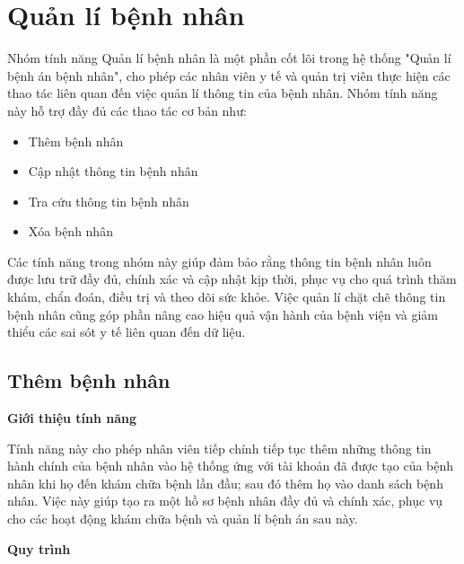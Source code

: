 \section{Quản lí bệnh nhân}

Nhóm tính năng Quản lí bệnh nhân là một phần cốt lõi trong hệ thống "Quản lí bệnh án bệnh nhân", cho phép các nhân viên y tế và quản trị viên thực hiện các thao tác liên quan đến việc quản lí thông tin của bệnh nhân. Nhóm tính năng này hỗ trợ đầy đủ các thao tác cơ bản như:
\begin{itemize}
  \item Thêm bệnh nhân
  \item Cập nhật thông tin bệnh nhân
  \item Tra cứu thông tin bệnh nhân
  \item Xóa bệnh nhân
\end{itemize}

Các tính năng trong nhóm này giúp đảm bảo rằng thông tin bệnh nhân luôn được lưu trữ đầy đủ, chính xác và cập nhật kịp thời, phục vụ cho quá trình thăm khám, chẩn đoán, điều trị và theo dõi sức khỏe. Việc quản lí chặt chẽ thông tin bệnh nhân cũng góp phần nâng cao hiệu quả vận hành của bệnh viện và giảm thiểu các sai sót y tế liên quan đến dữ liệu.

\subsection{Thêm bệnh nhân}

\noindent \textbf{Giới thiệu tính năng}

Tính năng này cho phép nhân viên tiếp chính tiếp tục thêm những thông tin hành chính của bệnh nhân vào hệ thống ứng với tài khoản đã được tạo của bệnh nhân khi họ đến khám chữa bệnh lần đầu; sau đó thêm họ vào danh sách bệnh nhân. Việc này giúp tạo ra một hồ sơ bệnh nhân đầy đủ và chính xác, phục vụ cho các hoạt động khám chữa bệnh và quản lí bệnh án sau này.

\noindent \textbf{Quy trình}


